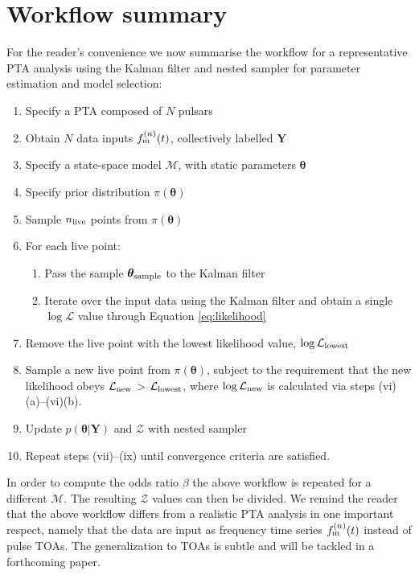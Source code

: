 \documentclass[fleqn,usenatbib,useAMS]{mnras}
\begin{document}
\section{Workflow summary}\label{sec:workflow}
For the reader's convenience we now summarise the workflow for a representative PTA analysis using the Kalman filter and nested sampler for parameter estimation and model selection:
\begin{enumerate}[leftmargin=2em]
	\item Specify a PTA composed of $N$ pulsars 
	\item Obtain $N$ data inputs $f_{\rm m}^{(n)}(t)$, collectively labelled $\boldsymbol{Y}$
	\item Specify a state-space model $\mathcal{M}$, with static parameters $\boldsymbol{\theta}$
	\item Specify prior distribution $\pi(\boldsymbol{\theta})$
	\item Sample $n_{\rm live}$ points from $\pi(\boldsymbol{\theta})$ 
	\item For each live point:
	\begin{enumerate}[leftmargin=2em]
		\item Pass the sample $\boldsymbol{\theta}_{\rm sample}$ to the Kalman filter
		\item Iterate over the input data using the Kalman filter and obtain a single $\log \mathcal{L}$ value through Equation \eqref{eq:likelihood}
	\end{enumerate}
	\item Remove the live point with the lowest likelihood value, $\log \mathcal{L}_{\rm lowest}$
	\item Sample a new live point from $\pi(\boldsymbol{\theta})$, subject to the requirement that the new likelihood obeys $\mathcal{L}_{\rm new}$ > $\mathcal{L}_{\rm lowest}$, where $\log \mathcal{L}_{\rm new}$ is calculated via steps (vi)(a)--(vi)(b).
	\item Update $p\left(\boldsymbol{\theta}|\boldsymbol{Y}\right)$ and $\mathcal{Z}$ with nested sampler
	\item Repeat steps (vii)--(ix) until convergence criteria are satisfied.
\end{enumerate}
In order to compute the odds ratio $\beta$ the above workflow is repeated for a different $\mathcal{M}$. The resulting $\mathcal{Z}$ values can then be divided. We remind the reader that the above workflow differs from a realistic PTA analysis in one important respect, namely that the data are input as frequency time series $f_{\rm m}^{(n)}(t)$ instead of pulse TOAs. The generalization to TOAs is subtle and will be tackled in a forthcoming paper.
\end{document}
